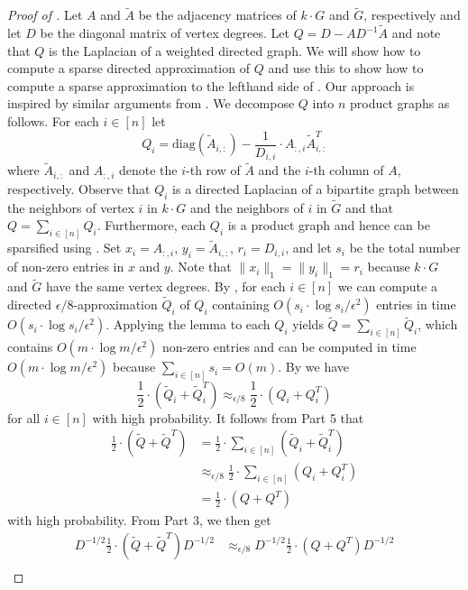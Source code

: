 \documentclass{toc}
\newcommand{\wt}{\widetilde}   %
\numberwithin{myalgctr}{section}
\theoremstyle{named}
\begin{document}
\begin{proof}[Proof of ]
Let $A$ and $\wt{A}$ be the adjacency matrices of $k\cdot G$ and $\wt{G}$, respectively and let $D$ be the diagonal matrix of vertex degrees. Let $Q=D-AD^{-1}\wt{A}$ and note that $Q$ is the Laplacian of a weighted directed graph. We will show how to compute a sparse directed approximation of $Q$ and use this to show how to compute a sparse approximation to the lefthand side of . Our approach is inspired by similar arguments from \cite{PS13, CKPPRSV16}. We decompose $Q$ into $n$ product graphs as follows. For each $i\in[n]$ let
\[
Q_i = \mathrm{diag}(\wt{A}_{i,:})-\frac{1}{D_{i,i}}\cdot A_{:,i}\wt{A}_{i,:}^T
\]
where $\wt{A}_{i,:}$ and $A_{:,i}$ denote the $i$-th row of $\wt{A}$ and the $i$-th column of $A$, respectively. Observe that $Q_i$ is a directed Laplacian of a bipartite graph between the neighbors of vertex $i$ in $k\cdot G$ and the neighbors of $i$ in $\wt{G}$ and that
$Q=\sum_{i\in [n]}Q_i$. Furthermore, each $Q_i$ is a product graph and hence can be sparsified using . Set $x_i=A_{:,i}$, $y_i=\wt{A}_{i,:}$, $r_i=D_{i,i}$, and let $s_i$ be the total number of non-zero entries in $x$ and $y$. Note that $\|x_i\|_1=\|y_i\|_1=r_i$ because $k\cdot G$ and $\wt{G}$ have the same vertex degrees. By , for each $i\in[n]$ we can compute a directed $\epsilon/8$-approximation $\wt{Q}_i$ of $Q_i$ containing $O(s_i\cdot \log s_i/\epsilon^2)$ entries in time $O(s_i\cdot \log s_i/\epsilon^2)$. Applying the lemma to each $Q_i$ yields $\wt{Q}=\sum_{i\in [n]}\wt{Q}_i$, which contains $O(m\cdot \log m/\epsilon^2)$ non-zero entries and can be computed in time $O(m\cdot \log m/\epsilon^2)$ because $\sum_{i\in[n]}s_i=O(m)$. By  we have 
\[
\frac{1}{2}\cdot(\wt{Q}_i+\wt{Q}_i^T)\approx_{\epsilon/8}\frac{1}{2}\cdot(Q_i+Q_i^T)
\]
for all $i\in[n]$ with high probability. It follows from  Part 5 that
\begin{align*}
\frac{1}{2}\cdot(\wt{Q}+\wt{Q}^T)&=\frac{1}{2}\cdot\sum_{i\in [n]}(\wt{Q}_i+\wt{Q}_i^T)\\
&\approx_{\epsilon/8}\frac{1}{2}\cdot\sum_{i\in [n]}(Q_i+Q_i^T)\\
&=\frac{1}{2}\cdot(Q+Q^T)
\end{align*}
with high probability. {}From  Part 3, we then get
\begin{align*}
D^{-1/2}\frac{1}{2}\cdot(\wt{Q}+\wt{Q}^T)D^{-1/2}&\approx_{\epsilon/8}D^{-1/2}\frac{1}{2}\cdot(Q+Q^T)D^{-1/2}\\

\end{align*}
\end{proof}
\end{document}
